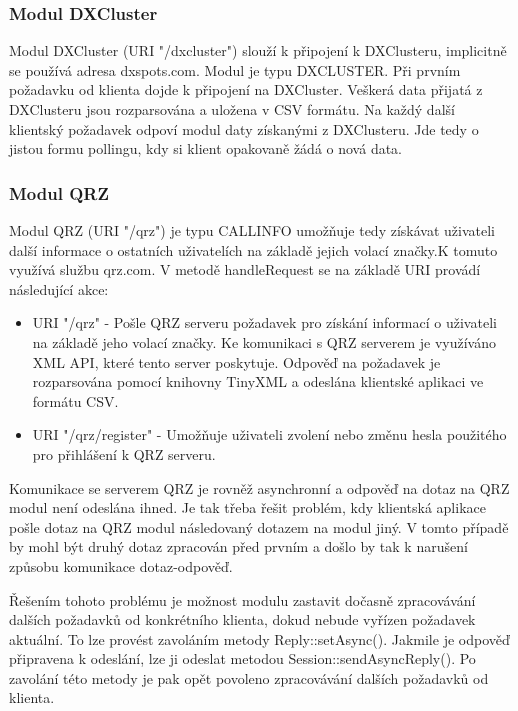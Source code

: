 \subsubsection{Modul DXCluster}

Modul DXCluster (URI "/dxcluster") slouží k připojení k DXClusteru, implicitně
se používá adresa dxspots.com. Modul je typu DXCLUSTER.
Při prvním požadavku od klienta dojde k připojení na DXCluster.
Veškerá data přijatá z DXClusteru jsou rozparsována a uložena v CSV formátu. Na každý
další klientský požadavek odpoví modul daty získanými z DXClusteru. Jde tedy o jistou formu pollingu, kdy si klient
opakovaně žádá o nová data.

\subsubsection{Modul QRZ}

Modul QRZ (URI "/qrz") je typu CALLINFO umožňuje tedy získávat uživateli další informace o ostatních uživatelích na základě jejich
volací značky.K tomuto využívá službu qrz.com. V metodě handleRequest se na základě URI provádí následující akce:

\begin{itemize}
\item URI "/qrz" - Pošle QRZ serveru požadavek pro získání informací o uživateli na základě jeho volací značky. Ke komunikaci 
s QRZ serverem je využíváno XML API, které tento server poskytuje. Odpověď na požadavek je rozparsována pomocí knihovny 
TinyXML a odeslána klientské aplikaci ve formátu CSV.
\item URI "/qrz/register" - Umožňuje uživateli zvolení nebo změnu hesla použitého pro přihlášení k QRZ serveru.
\end{itemize}

Komunikace se serverem QRZ je rovněž asynchronní a odpověď na dotaz na QRZ modul není odeslána ihned.
Je tak třeba řešit problém, kdy klientská aplikace pošle dotaz na QRZ modul
následovaný dotazem na modul jiný. V tomto případě by mohl být druhý dotaz zpracován před prvním a došlo by tak k narušení
způsobu komunikace dotaz-odpověď.

Řešením tohoto problému je možnost modulu zastavit dočasně zpracovávání dalších požadavků od konkrétního klienta, dokud 
nebude vyřízen požadavek aktuální. To lze provést zavoláním metody Reply::setAsync(). Jakmile je odpověď připravena
k odeslání, lze ji odeslat metodou Session::sendAsyncReply(). Po zavolání této metody je pak opět povoleno zpracovávání
dalších požadavků od klienta.


